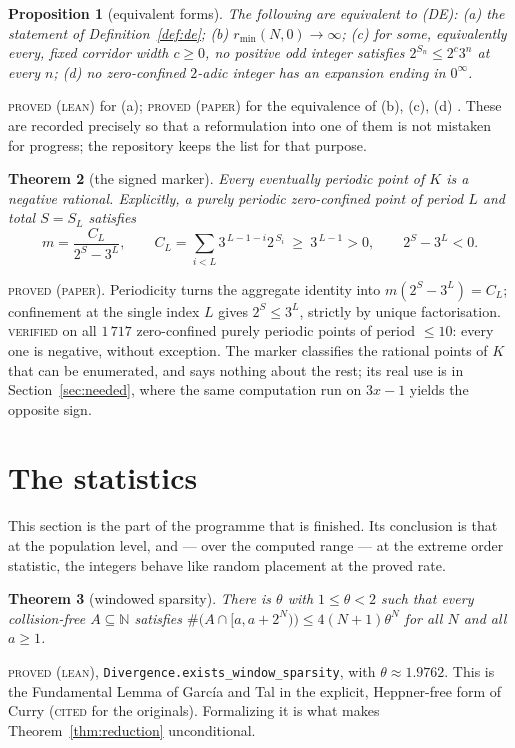 \documentclass[11pt,reqno]{amsart}
\theoremstyle{plain}
\newtheorem{theorem}{Theorem}[section]
\newtheorem{proposition}[theorem]{Proposition}
\theoremstyle{definition}
\newcommand{\N}{\mathbb{N}}
\newcommand{\lab}[1]{\textnormal{\textsc{\small #1}}}
\begin{document}
\begin{proposition}[equivalent forms]\label{prop:equivalent}
The following are equivalent to \textup{(DE)}:
\textup{(a)} the statement of Definition~\ref{def:de};
\textup{(b)} $r_{\min}(N,0)\to\infty$;
\textup{(c)} for some, equivalently every, fixed corridor width $c\ge 0$, no
positive odd integer satisfies $2^{S_n}\le 2^{c}3^{n}$ at every $n$;
\textup{(d)} no zero-confined $2$-adic integer has an expansion ending in
$0^{\infty}$.
\end{proposition}
\lab{proved (lean)} for (a); \lab{proved (paper)} for the equivalence of (b),
(c), (d) \cite{DeJesusEOC,EOCDivergenceRepo}. These are recorded precisely so that
a reformulation into one of them is not mistaken for progress; the repository
keeps the list for that purpose.

\begin{theorem}[the signed marker]\label{thm:marker}
Every eventually periodic point of $K$ is a \emph{negative} rational. Explicitly,
a purely periodic zero-confined point of period $L$ and total $S=S_L$ satisfies
\[
m=\frac{C_L}{2^{S}-3^{L}},\qquad
C_L=\sum_{i<L}3^{\,L-1-i}2^{\,S_i}\ \ge\ 3^{\,L-1}>0,\qquad 2^{S}-3^{L}<0 .
\]
\end{theorem}
\lab{proved (paper)}. Periodicity turns the aggregate identity into
$m(2^{S}-3^{L})=C_L$; confinement at the single index $L$ gives $2^{S}\le 3^{L}$,
strictly by unique factorisation. \lab{verified} on all $1\,717$ zero-confined
purely periodic points of period $\le 10$: every one is negative, without
exception. The marker classifies the rational points of $K$ that can be
enumerated, and says nothing about the rest; its real use is in
Section~\ref{sec:needed}, where the same computation run on $3x-1$ yields the
opposite sign.

\section{The statistics}\label{sec:statistics}

This section is the part of the programme that is finished. Its conclusion is
that at the population level, and --- over the computed range --- at the extreme
order statistic, the integers behave like random placement at the proved rate.

\begin{theorem}[windowed sparsity]\label{thm:sparsity}
There is $\theta$ with $1\le\theta<2$ such that every collision-free
$A\subseteq\N$ satisfies
$\#\bigl(A\cap[a,a+2^{N})\bigr)\le 4(N+1)\theta^{N}$ for all $N$ and all $a\ge1$.
\end{theorem}
\lab{proved (lean)}, \texttt{Divergence.exists\_window\_sparsity}, with
$\theta\approx1.9762$. This is the Fundamental Lemma of Garc\'ia and Tal
\cite{GarciaTal1999} in the explicit, Heppner-free form of Curry
\cite{Curry2026} (\lab{cited} for the originals). Formalizing it is what makes
Theorem~\ref{thm:reduction} unconditional.
\end{document}
